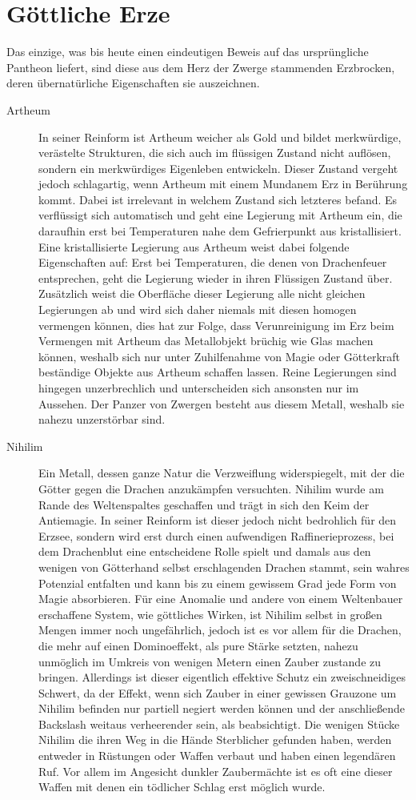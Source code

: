 \documentclass[a4paper,12pt,oneside]{book}
\begin{document}
\section{Göttliche Erze}
Das einzige, was bis heute einen eindeutigen Beweis auf das ursprüngliche Pantheon liefert, sind diese aus dem Herz der Zwerge stammenden Erzbrocken, deren übernatürliche Eigenschaften sie auszeichnen.
\begin{description}
\item[Artheum]In seiner Reinform ist Artheum weicher als Gold und bildet merkwürdige, verästelte Strukturen, die sich auch im flüssigen Zustand nicht auflösen, sondern ein merkwürdiges Eigenleben entwickeln. Dieser Zustand vergeht jedoch schlagartig, wenn Artheum mit einem Mundanem Erz in Berührung kommt. Dabei ist irrelevant in welchem Zustand sich letzteres befand. Es verflüssigt sich automatisch und geht eine Legierung mit Artheum ein, die daraufhin erst bei Temperaturen nahe dem Gefrierpunkt aus kristallisiert. Eine kristallisierte Legierung aus Artheum weist dabei folgende Eigenschaften auf: Erst bei Temperaturen, die denen von Drachenfeuer entsprechen, geht die Legierung wieder in ihren Flüssigen Zustand über. Zusätzlich weist die Oberfläche dieser Legierung alle nicht gleichen Legierungen ab und wird sich daher niemals mit diesen homogen vermengen können, dies hat zur Folge, dass Verunreinigung im Erz beim Vermengen mit Artheum das Metallobjekt brüchig wie Glas machen können, weshalb sich nur unter Zuhilfenahme von Magie oder Götterkraft beständige Objekte aus Artheum schaffen lassen. Reine Legierungen sind hingegen unzerbrechlich und unterscheiden sich ansonsten nur im Aussehen. Der Panzer von Zwergen besteht aus diesem Metall, weshalb sie nahezu unzerstörbar sind.
\item[Nihilim]Ein Metall, dessen ganze Natur die Verzweiflung widerspiegelt, mit der die Götter gegen die Drachen anzukämpfen versuchten. Nihilim wurde am Rande des Weltenspaltes geschaffen und trägt in sich den Keim der Antiemagie. In seiner Reinform ist dieser jedoch nicht bedrohlich für den Erzsee, sondern wird erst durch einen aufwendigen Raffinerieprozess, bei dem Drachenblut eine entscheidene Rolle spielt und damals aus den wenigen von Götterhand selbst erschlagenden Drachen stammt, sein wahres Potenzial entfalten und kann bis zu einem gewissem Grad jede Form von Magie absorbieren. Für eine Anomalie und andere von einem Weltenbauer erschaffene System, wie göttliches Wirken, ist Nihilim selbst in großen Mengen immer noch ungefährlich, jedoch ist es vor allem für die Drachen, die mehr auf einen Dominoeffekt, als pure Stärke setzten, nahezu unmöglich im Umkreis von wenigen Metern einen Zauber zustande zu bringen. Allerdings ist dieser eigentlich effektive Schutz ein zweischneidiges Schwert, da der Effekt, wenn sich Zauber in einer gewissen Grauzone um Nihilim befinden nur partiell negiert werden können und der anschließende Backslash weitaus verheerender sein, als beabsichtigt. Die wenigen Stücke Nihilim die ihren Weg in die Hände Sterblicher gefunden haben, werden entweder in Rüstungen oder Waffen verbaut und haben einen legendären Ruf. Vor allem im Angesicht dunkler Zaubermächte ist es oft eine dieser Waffen mit denen ein tödlicher Schlag erst möglich wurde.

\end{description}
\end{document}
